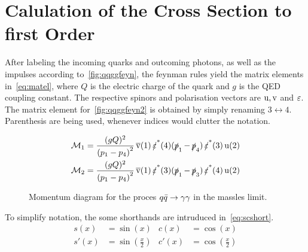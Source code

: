 \section{Calulation of the Cross Section to first Order}%
\label{sec:qqggcalc}

After labeling the incoming quarks and outcoming photons, as well as
the impulses according to~\ref{fig:qqggfeyn}, the feynman rules yield
the matrix elements in~\eqref{eq:matel}, where \(Q\) is the electric
charge of the quark and \(g\) is the QED coupling constant. The
respective spinors and polarisation vectors are \(\operatorname{u},\operatorname{v}\) and
\(\operatorname{\varepsilon}\).  The matrix element for~\ref{fig:qqggfeyn2} is obtained by
simply renaming \(3\leftrightarrow 4\). Parenthesis are being used,
whenever indices would clutter the notation.

\begin{align}
  \label{eq:matel}
  \mathcal{M}_1 &= \frac{(gQ)^2}{\qty(p_1 - p_4)^2}\vsb(1)\pses(4)(\ps_1 -
                \ps_4)\pses(3)\us(2)\\
  \mathcal{M}_2 &= \frac{(gQ)^2}{\qty(p_1 - p_4)^2}\vsb(1)\pses(3)(\ps_1 - \ps_3)\pses(4)\us(2)
\end{align}

\begin{wrapfigure}{R}{0.4\textwidth}
\centering
{}
\caption{\label{fig:qqimpulses} Momentum diagram for the proces
  \(q\bar{q}\rightarrow\gamma\gamma\) in the massles limit.}
\end{wrapfigure}


To simplify notation, the some shorthands are intruduced
in~\eqref{eq:scshort}.
\begin{equation}
  \label{eq:scshort}
  \begin{split}
    s(x) &= \sin(x) & c(x) &= \cos(x) \\ s'(x) &= \sin(\frac{x}{2}) & c'(x) &= \cos(\frac{x}{2})
  \end{split}
\end{equation}

